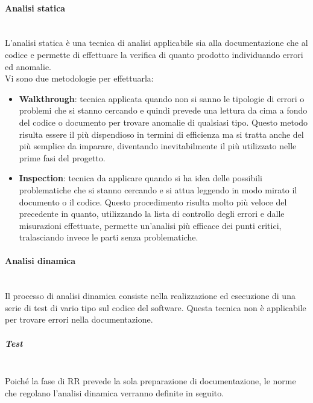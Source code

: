     \paragraph{Analisi statica}
        ~\\ 
        L’analisi statica è una tecnica di analisi applicabile sia alla documentazione che al codice e permette di effettuare la verifica di quanto prodotto individuando errori ed anomalie.\\
        Vi sono due metodologie per effettuarla:
            \begin{itemize}
                \item \textbf{Walkthrough}: tecnica applicata quando non si sanno le tipologie di errori o problemi che si stanno cercando e quindi prevede una lettura da cima a fondo del codice o documento per trovare anomalie di qualsiasi tipo. Questo metodo risulta essere il più dispendioso in termini di efficienza ma si tratta anche del più semplice da imparare, diventando inevitabilmente il più utilizzato nelle prime fasi del progetto.
                \item \textbf{Inspection}: tecnica da applicare quando si ha idea delle possibili problematiche che si stanno cercando e si attua leggendo in modo mirato il documento o il codice. Questo procedimento risulta molto più veloce del precedente in quanto,
                utilizzando la lista di controllo degli errori e dalle misurazioni effettuate, permette un’analisi più efficace dei punti critici, tralasciando invece le parti senza problematiche.
            \end{itemize}
        
        \paragraph {Analisi dinamica}
        ~\\
        Il processo di analisi dinamica consiste nella realizzazione ed esecuzione di una serie di test di vario tipo sul codice del software.  Questa tecnica non è applicabile per trovare errori nella documentazione. 
        
            \subparagraph{Test}
            ~\\
            Poiché la fase di RR prevede la sola preparazione di documentazione, le norme che regolano l'analisi dinamica verranno definite in seguito.
        

